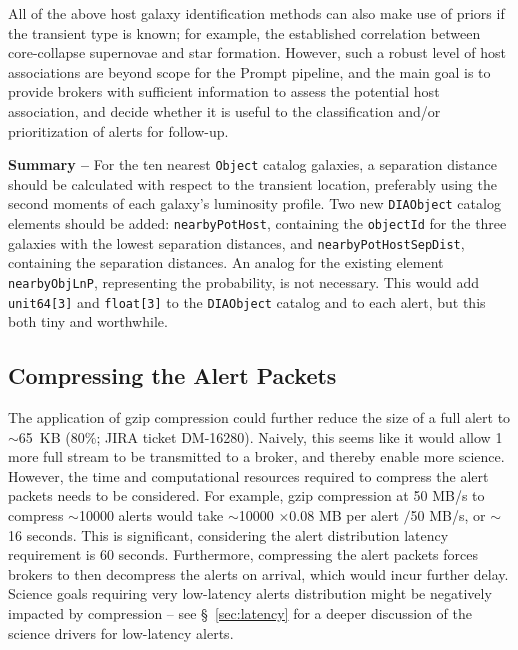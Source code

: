 \documentclass[DM,lsstdraft,authoryear,toc]{lsstdoc}
\begin{document}
All of the above host galaxy identification methods can also make use of priors if the transient type is known; for example, the established correlation between core-collapse supernovae and star formation.
However, such a robust level of host associations are beyond scope for the Prompt pipeline, and the main goal is to provide brokers with sufficient information to assess the potential host association, and decide whether it is useful to the classification and/or prioritization of alerts for follow-up. 

{\bf Summary --} For the ten nearest {\tt Object} catalog galaxies, a separation distance should be calculated with respect to the transient location, preferably using the second moments of each galaxy's luminosity profile. Two new {\tt DIAObject} catalog elements should be added: {\tt nearbyPotHost}, containing the {\tt objectId} for the three galaxies with the lowest separation distances, and {\tt nearbyPotHostSepDist}, containing the separation distances. An analog for the existing element {\tt nearbyObjLnP}, representing the probability, is not necessary. This would add {\tt unit64[3]} and {\tt float[3]} to the {\tt DIAObject} catalog and to each alert, but this both tiny and worthwhile.

\subsection{Compressing the Alert Packets}\label{ssec:packets_compress}

The application of gzip compression could further reduce the size of a full alert to $\sim$65~KB (80\%; JIRA ticket DM-16280).
Naively, this seems like it would allow 1 more full stream to be transmitted to a broker, and thereby enable more science.
However, the time and computational resources required to compress the alert packets needs to be considered.
For example, gzip compression at 50 MB/s to compress $\sim$10000 alerts would take $\sim$10000 $\times$0.08 MB per alert $/$50 MB/s, or $\sim$16 seconds.
This is significant, considering the alert distribution latency requirement is 60 seconds. 
Furthermore, compressing the alert packets forces brokers to then decompress the alerts on arrival, which would incur further delay.
Science goals requiring very low-latency alerts distribution might be negatively impacted by compression -- see \S~\ref{sec:latency} for a deeper discussion of the science drivers for low-latency alerts.
\end{document}
